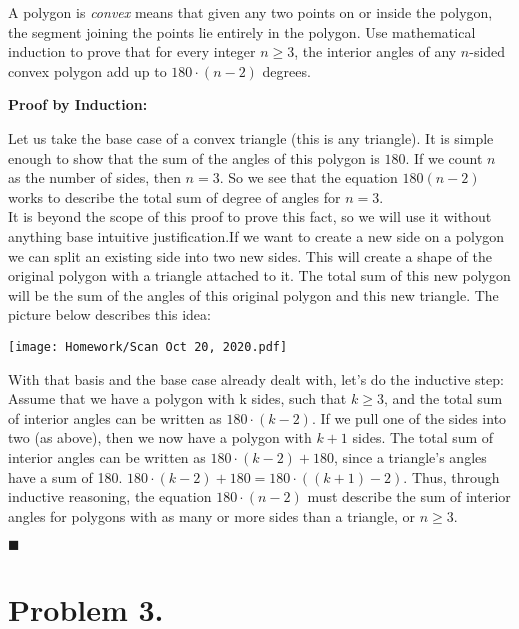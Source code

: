 \documentclass[11pt]{article}
\begin{document}
\noindent
A polygon is {\em convex} means that given any two points on or inside the polygon, the segment joining the points lie entirely in the polygon.
Use mathematical induction to prove that for every integer $n\geq 3$, the interior angles of any $n$-sided convex polygon add up to $180\cdot (n-2)$ degrees.
\newline

{\bf Proof by Induction:}

Let us take the base case of a convex triangle (this is any triangle). It is simple enough to show that the sum of the angles of this polygon is $180$. If we count $n$ as the number of sides, then $n=3$. So we see that the equation $180(n-2)$ works to describe the total sum of degree of angles for $n=3$.\\

It is beyond the scope of this proof to prove this fact, so we will use it without anything base intuitive justification.If we want to create a new side on a polygon we can split an existing side into two new sides. This will create a shape of the original polygon with a triangle attached to it. The total sum of this new polygon will be the sum of the angles of this original polygon and this new triangle. The picture below describes this idea: 
\begin{center}
\texttt{[image: Homework/Scan Oct 20, 2020.pdf]}
\end{center}
With that basis and the base case already dealt with, let's do the inductive step:\\

Assume that we have a polygon with k sides, such that $k\geq 3$, and the total sum of interior angles can be written as $180\cdot (k-2)$. If we pull one of the sides into two (as above), then we now have a polygon with $k+1$ sides. The total sum of interior angles can be written as $180\cdot (k-2) + 180$, since a triangle's angles have a sum of 180. $180 \cdot (k-2) + 180 = 180 \cdot ((k+1)-2)$. Thus, through inductive reasoning, the equation $180\cdot (n-2)$ must describe the sum of interior angles for polygons with as many or more sides than a triangle, or $n\geq 3$.
\begin{flushright}$\blacksquare$\end{flushright}




\newpage

\section*{Problem 3.}
\end{document}
